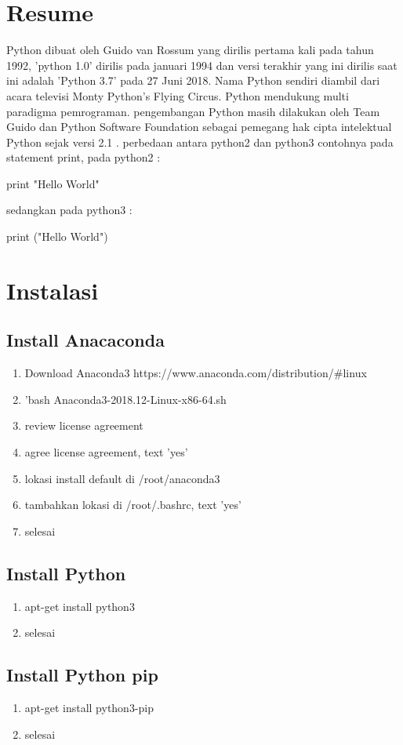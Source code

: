 \section{Resume}
\begin{flushleft}
\qquad Python dibuat oleh Guido van Rossum yang dirilis pertama  kali pada tahun 1992, 'python 1.0' dirilis pada januari 1994 dan versi terakhir yang ini dirilis saat ini adalah 'Python 3.7' pada 27 Juni 2018. Nama Python sendiri diambil dari acara televisi Monty Python's Flying Circus. Python mendukung multi paradigma pemrograman. pengembangan Python masih dilakukan oleh Team Guido dan Python Software Foundation sebagai pemegang hak cipta intelektual Python sejak versi 2.1 . perbedaan antara python2 dan python3 contohnya pada statement print, pada python2 : 

print "Hello World"

sedangkan pada python3 :

print ("Hello World")
\end{flushleft}

\section{Instalasi}
\subsection{Install Anacaconda}
\begin{enumerate}
\item Download Anaconda3 https://www.anaconda.com/distribution/#linux
\item 'bash Anaconda3-2018.12-Linux-x86-64.sh
\item review license agreement
\item agree license agreement, text 'yes'
\item lokasi install default di /root/anaconda3
\item tambahkan lokasi di /root/.bashrc, text 'yes'
\item selesai
\end{enumerate}

\subsection{Install Python}
\begin{enumerate}
\item apt-get install python3
\item selesai
\end{enumerate}

\subsection{Install Python pip}
\begin{enumerate}
\item apt-get install python3-pip
\item selesai
\end{enumerate}